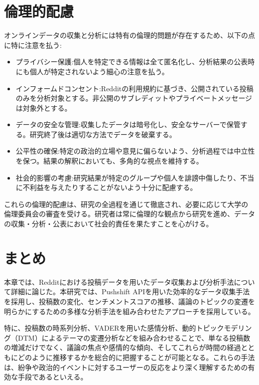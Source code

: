 \documentclass[11pt, a4j]{jreport}
\begin{document}
    \section{倫理的配慮}
    オンラインデータの収集と分析には特有の倫理的問題が存在するため、以下の点に特に注意を払う:

    \begin{itemize}
        \item プライバシー保護:個人を特定できる情報は全て匿名化し、分析結果の公表時にも個人が特定されないよう細心の注意を払う。

        \item インフォームドコンセント:Redditの利用規約に基づき、公開されている投稿のみを分析対象とする。非公開のサブレディットやプライベートメッセージは対象外とする。

        \item データの安全な管理:収集したデータは暗号化し、安全なサーバーで保管する。研究終了後は適切な方法でデータを破棄する。

        \item 公平性の確保:特定の政治的立場や意見に偏らないよう、分析過程では中立性を保つ。結果の解釈においても、多角的な視点を維持する。

        \item 社会的影響の考慮:研究結果が特定のグループや個人を誹謗中傷したり、不当に不利益を与えたりすることがないよう十分に配慮する。
    \end{itemize}

    これらの倫理的配慮は、研究の全過程を通じて徹底され、必要に応じて大学の倫理委員会の審査を受ける。研究者は常に倫理的な観点から研究を進め、データの収集・分析・公表において社会的責任を果たすことを心がける。

    \section{まとめ}
    本章では、Redditにおける投稿データを用いたデータ収集および分析手法について詳細に論じた。本研究では、Pushshift APIを用いた効率的なデータ収集手法を採用し、投稿数の変化、センチメントスコアの推移、議論のトピックの変遷を明らかにするための多様な分析手法を組み合わせたアプローチを採用している。

    特に、投稿数の時系列分析、VADERを用いた感情分析、動的トピックモデリング（DTM）によるテーマの変遷分析などを組み合わせることで、単なる投稿数の増減だけでなく、議論の焦点や感情的な傾向、そしてこれらが時間の経過とともにどのように推移するかを総合的に把握することが可能となる。これらの手法は、紛争や政治的イベントに対するユーザーの反応をより深く理解するための有効な手段であるといえる。
\end{document}
